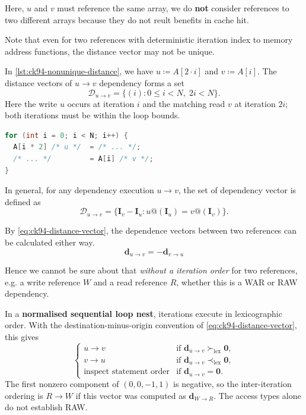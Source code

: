 Here, $u$ and $v$ must reference the same array, we do \textbf{not}
consider references to two different arrays because they do not reult benefits
in cache hit.

Note that even for two references with deterministic iteration index to memory
address functions, the distance vector may not be unique.

In \cref{lst:ck94-nonunique-distance}, we have $u \coloneqq A[2 \cdot i]$ and $v \coloneqq
A[i]$. The distance vectors of $u \rightarrow v$ dependency forms a set
\[
\mathcal{D}_{u \rightarrow v}
= \{(i): 0 \le i < N,\; 2i < N\}.
\]
Here the write $u$ occurs at iteration $i$ and the matching read $v$ at
iteration $2i$; both iterations must be within the loop bounds.

\begin{lstlisting}[label={lst:ck94-nonunique-distance},
language=C, caption={Non-unique Distance Vector Example}]
for (int i = 0; i < N; i++) {
  A[i * 2] /* u */  = /* ... */;
  /* ... */         = A[i] /* v */;
}
\end{lstlisting}

In general, for any dependency execution $u \rightarrow v$, the set of
dependency vector is defined as
\begin{equation}
\mathcal{D}_{u \rightarrow v}
  = \{\mathbf{I}_{v} - \mathbf{I}_{u}:
  u@(\mathbf{I}_{u}) = v@(\mathbf{I}_{v})\}.
  \label{eq:ck94-distance-vector-set}
\end{equation}

By \cref{eq:ck94-distance-vector}, the dependence vectors between two references
can be calculated either way.
\[
\mathbf{d}_{u \rightarrow v}= - \mathbf{d}_{v \rightarrow u}
\]

Hence we cannot be sure about that \textit{without a iteration order}
for two references, e.g. a write reference $W$ and a read reference $R$,
whether this is a WAR or RAW dependency.

In a \textbf{normalised sequential loop nest}, iterations execute in
lexicographic order. With the destination-minus-origin convention of
\cref{eq:ck94-distance-vector}, this gives
\begin{equation}
  \begin{cases}
    u \rightarrow v &\text{if } \mathbf{d}_{u\to v} \succ_{\mathrm{lex}} \mathbf{0}, \\
    v \rightarrow u &\text{if } \mathbf{d}_{u\to v} \prec_{\mathrm{lex}} \mathbf{0}, \\
    \text{inspect statement order} &\text{if } \mathbf{d}_{u\to v} = \mathbf{0}.
  \end{cases}
  \label{eq:ck94-dependence-order}
\end{equation}
The first nonzero component of $(0,0,-1,1)$ is negative, so the
inter-iteration ordering is $R\rightarrow W$ if this vector was computed
as $\mathbf{d}_{W\to R}$. The access types alone do not establish RAW.

